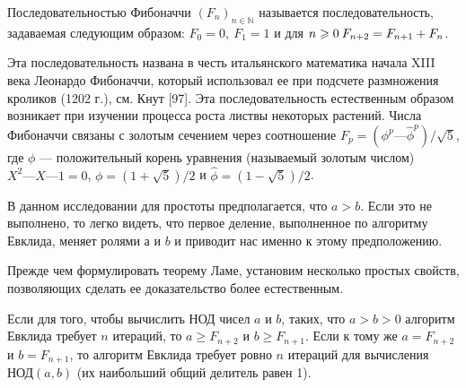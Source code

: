\begin{determ}
\hspace*{15pt}Последовательностью Фибоначчи $(F_n)_{n \in \mathbb{N}}$ называется  
последовательность, задаваемая следующим образом: $F_0 = 0,\: F_1 = 1$ и для $n \geqslant 0\:
F_{n+2} = \newline F_{n+1} + F_n$.
\end{determ}

\begin{mynotice} 
Эта последовательность названа в честь  
итальянского математика начала XIII века Леонардо Фибоначчи,  
который использовал ее при подсчете размножения кроликов (1202 г.), 
см. Кнут [97]. Эта последовательность естественным образом  
возникает при изучении процесса роста листвы некоторых растений. 
Числа Фибоначчи связаны с золотым сечением через  
соотношение $F_p = (\phi^p — \hat{\phi}^p)\slash \sqrt{5}$, где $\phi$ — положительный корень уравнения 
(называемый золотым числом) $X^2 — X — 1 = 0$, $\phi = (1 + \sqrt{5})\slash 2$ и 
$\hat{\phi} = (1 - \sqrt{5})\slash 2$.\newline 
\end{mynotice}

В данном исследовании для простоты предполагается, что $a > b$. 
Если это не выполнено, то легко видеть, что первое деление,  
выполненное по алгоритму Евклида, меняет ролями $а$ и $b$ и приводит нас именно 
к этому предположению.
 
Прежде чем формулировать теорему Ламе, установим несколько 
простых свойств, позволяющих сделать ее доказательство более  
естественным. 

\begin{property}
\hspace*{15pt}Если для того, чтобы вычислить $\text{НОД}$ чисел $a$ и $b$, таких, что 
$a > b > 0$ алгоритм Евклида требует $n$ итераций, то $a \geqslant F_{n+2}$ и 
$b \geqslant F_{n+1}$. Если к тому же $a = F_{n+2}$ и $b = F_{n+1}$, то алгоритм Евклида 
требует ровно $n$ итераций для вычисления $\text{НОД}(a, b)$ (их наибольший 
общий делитель равен 1). 
\end{property}

